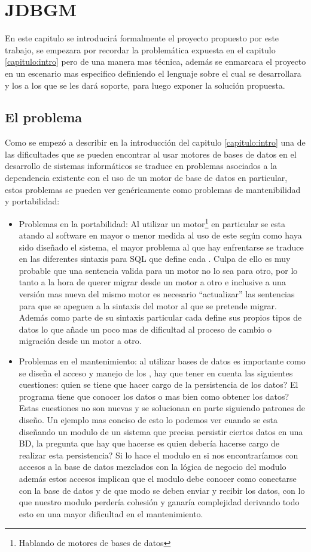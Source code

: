 \chapter{JDBGM}
%
%
En este capitulo se introducirá formalmente el proyecto propuesto por este trabajo, se empezara por recordar la problemática expuesta en el capitulo \ref{capitulo:intro} pero de una manera mas técnica, además se enmarcara el proyecto en un escenario mas especifico definiendo el lenguaje sobre el cual se desarrollara y los \dd a los que se les dará soporte, para luego exponer la solución propuesta.
%
\section{El problema}
%
Como se empezó a describir en la introducción del capitulo \ref{capitulo:intro} una de las dificultades que se pueden encontrar al usar motores de bases de datos en el desarrollo de sistemas informáticos se traduce en problemas asociados a la dependencia existente con el uso de un motor de base de datos en particular, estos problemas se pueden ver genéricamente como problemas de mantenibilidad y portabilidad:
%
\begin{itemize}
%
\item Problemas en la portabilidad: Al utilizar un motor\footnote{Hablando de motores de bases de datos} en particular se esta atando al software en mayor o menor medida al uso de este según como haya sido diseñado el sistema, el mayor problema al que hay enfrentarse se traduce en las diferentes sintaxis para SQL que define cada \dd. Culpa de ello es muy probable que una sentencia valida para un motor no lo sea para otro, por lo tanto a la hora de querer migrar desde un motor a otro e inclusive a una versión mas nueva del mismo motor es necesario  ``actualizar'' las sentencias para que se apeguen a la sintaxis del motor al que se pretende migrar. Además como parte de su sintaxis particular cada \dd define sus propios tipos de datos lo que añade un poco mas de dificultad al proceso de cambio o migración desde un motor a otro.  
%
\item  Problemas en el mantenimiento: al utilizar bases de datos es importante como se diseña el acceso y manejo de los \dd, hay que tener en cuenta las siguientes cuestiones: quien se tiene que hacer cargo de la persistencia de los datos? El programa tiene que conocer los datos o mas bien como obtener los datos? Estas cuestiones no son nuevas y se solucionan en parte siguiendo patrones de diseño. Un ejemplo mas conciso de esto lo podemos ver cuando se esta diseñando un modulo de un sistema que precisa persistir ciertos datos en una BD, la pregunta que hay que hacerse es quien debería hacerse cargo de realizar esta persistencia? Si lo hace el modulo en si nos encontraríamos con accesos a la base de datos mezclados con la lógica de negocio del modulo además estos accesos implican que el modulo debe conocer como conectarse con la base de datos y de que modo se deben enviar y recibir los datos, con lo que nuestro modulo	perdería cohesión y ganaría complejidad derivando todo esto en una mayor dificultad en el mantenimiento.
\end{itemize}
